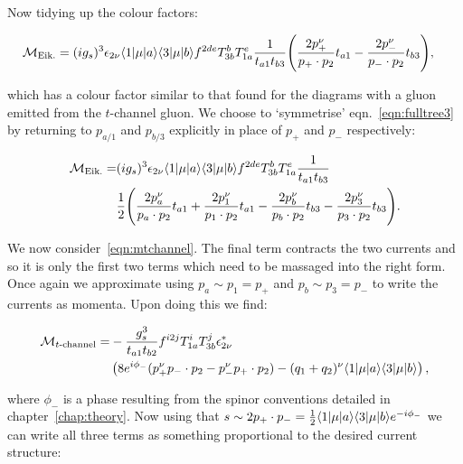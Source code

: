 	Now tidying up the colour factors:

	\begin{align}
	\begin{split}
		\mathcal{M}_{\text{Eik.}} = (ig_s)^3 \epsilon_{2\nu} \langle 1 | \mu | a \rangle \langle 3 | \mu | b \rangle
		f^{2de}T^b_{3b}T^e_{1a}\frac{1}{t_{a1}t_{b3}}\Bigg(&
		\frac{2p_+^\nu}{p_+\cdot p_2}t_{a1} - \frac{2p_-^\nu}{p_-\cdot p_2}t_{b3}\Bigg),
		\label{eq:fulltree3}
	\end{split}
	\end{align}

	which has a colour factor similar to that found for the diagrams with a gluon emitted from the
	$t$-channel gluon.  We choose to `symmetrise' eqn.~\eqref{eqn:fulltree3} by returning to $p_{a/1}$
	and $p_{b/3}$ explicitly in place of $p_+$ and $p_-$ respectively:

	\begin{align}
	\begin{split}
		\mathcal{M}_{\text{Eik.}} = &(ig_s)^3 \epsilon_{2\nu} \langle 1 | \mu | a \rangle \langle 3 | \mu | b \rangle f^{2de}T^b_{3b}T^e_{1a}\frac{1}{t_{a1}t_{b3}}\\
		&\frac{1}{2}\Bigg(\frac{2p_a^\nu}{p_a\cdot p_2}t_{a1} + \frac{2p_1^\nu}{p_1\cdot p_2}t_{a1} -
		\frac{2p_b^\nu}{p_b\cdot p_2}t_{b3} - \frac{2p_3^\nu}{p_3\cdot p_2}t_{b3}\Bigg).
		\label{eq:fulltree4}
	\end{split}
	\end{align}

	We now consider~\eqref{eqn:mtchannel}.  The final term contracts the two currents and so it is
	only the first two terms which need to be massaged into the right form.  Once again we
	approximate using $p_a\sim p_1=p_+$ and $p_b\sim p_3=p_-$ to write the currents as momenta.
	Upon doing this we find:

	\begin{align}
	\begin{split}
		\mathcal{M}_{t\text{-channel}} = &-\frac{g_s^3}{t_{a1}t_{b2}}f^{i2j}T^i_{1a}T^j_{3b} \epsilon^*_{2\nu} \\
		&\left(8e^{i\phi_-}(p_+^\nu p_-\cdot p_2 - p_-^\nu p_+\cdot p_2) - (q_1 + q_2)^\nu \langle 1 | \mu | a \rangle\langle 3 | \mu | b \rangle \right),
		\label{eqn:mtchannel2}
	\end{split}
	\end{align}

	where $\phi_-$ is a phase resulting from the spinor conventions detailed in chapter~\ref{chap:theory}.
	Now using that $s\sim2p_+\cdot p_-=\frac{1}{2}\langle 1 | \mu | a \rangle\langle 3 | \mu | b \rangle e^{-i\phi_-}$ we can write all
	three terms as something proportional to the desired current structure:

